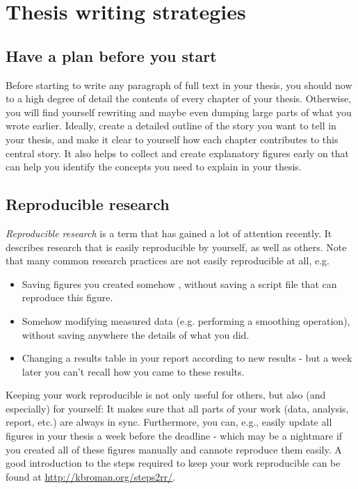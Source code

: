 \section{Thesis writing strategies}

\subsection{Have a plan before you start}
Before starting to write any paragraph of full text in your thesis, you should now to a high degree of detail the contents of every chapter of your thesis.
Otherwise, you will find yourself rewriting and maybe even dumping large parts of what you wrote earlier.
Ideally, create a detailed outline of the story you want to tell in your thesis, and make it clear to yourself how each chapter contributes to this central story.
It also helps to collect and create explanatory figures early on that can help you identify the concepts you need to explain in your thesis.

\subsection{Reproducible research}
\emph{Reproducible research} is a term that has gained a lot of attention recently.
It describes research that is easily reproducible by yourself, as well as others.
Note that many common research practices are not easily reproducible at all, e.g.
\begin{itemize}
\item Saving figures you created somehow , without saving a script file that can reproduce this figure.
\item Somehow modifying measured data (e.g. performing a smoothing operation), without saving anywhere the details of what you did.
\item Changing a results table in your report according to new results - but a week later you can't recall how you came to these results.
\end{itemize}
Keeping your work reproducible is not only useful for others, but also (and especially) for yourself: It makes sure that all parts of your work (data, analysis, report, etc.) are always in sync.
Furthermore, you can, e.g., easily update all figures in your thesis a week before the deadline - which may be a nightmare if you created all of these figures manually and cannote reproduce them easily.
A good introduction to the steps required to keep your work reproducible can be found at \url{http://kbroman.org/steps2rr/}.

